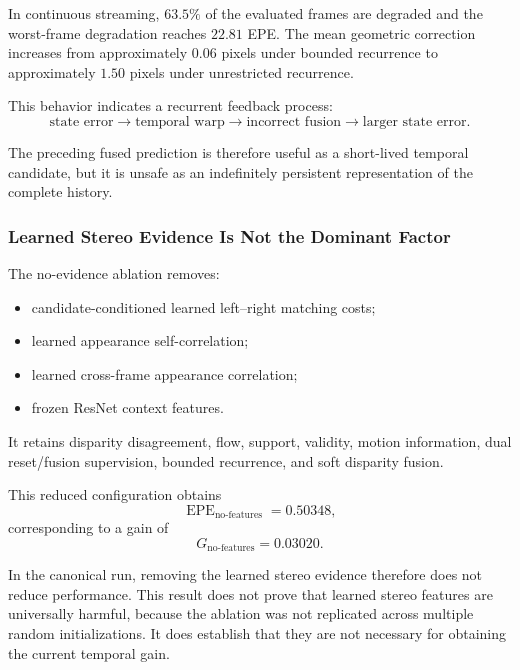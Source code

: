 \documentclass[11pt,a4paper]{article}
\begin{document}
In continuous streaming, \(63.5\%\) of the evaluated frames are degraded and the
worst-frame degradation reaches \(22.81\) EPE. The mean geometric correction increases
from approximately \(0.06\) pixels under bounded recurrence to approximately
\(1.50\) pixels under unrestricted recurrence.

This behavior indicates a recurrent feedback process:
\begin{equation}
    \text{state error}
    \rightarrow
    \text{temporal warp}
    \rightarrow
    \text{incorrect fusion}
    \rightarrow
    \text{larger state error}.
\end{equation}

The preceding fused prediction is therefore useful as a short-lived temporal candidate,
but it is unsafe as an indefinitely persistent representation of the complete history.

\subsubsection{Learned Stereo Evidence Is Not the Dominant Factor}

The no-evidence ablation removes:

\begin{itemize}
    \item candidate-conditioned learned left--right matching costs;
    \item learned appearance self-correlation;
    \item learned cross-frame appearance correlation;
    \item frozen ResNet context features.
\end{itemize}

It retains disparity disagreement, flow, support, validity, motion information, dual
reset/fusion supervision, bounded recurrence, and soft disparity fusion.

This reduced configuration obtains
\begin{equation}
    \operatorname{EPE}_{\mathrm{no\text{-}features}}
    =
    0.50348,
\end{equation}
corresponding to a gain of
\begin{equation}
    G_{\mathrm{no\text{-}features}}
    =
    0.03020.
\end{equation}

In the canonical run, removing the learned stereo evidence therefore does not reduce
performance. This result does not prove that learned stereo features are universally
harmful, because the ablation was not replicated across multiple random initializations.
It does establish that they are not necessary for obtaining the current temporal gain.
\end{document}
